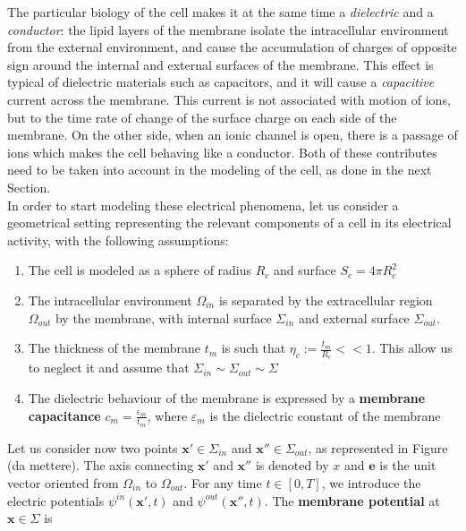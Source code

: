 \documentclass[12pt, a4paper]{report}
\begin{document}
The particular biology of the cell makes it at the same time a \textit{dielectric} and a \textit{conductor}: the lipid layers of the membrane isolate the intracellular environment from the external environment, and cause the accumulation of charges of opposite sign around the internal and external surfaces of the membrane. This effect is typical of dielectric materials such as capacitors, and it will cause a \textit{capacitive} current across the membrane. This current is not associated with motion of ions, but to the time rate of change of the surface charge on each side of the membrane. On the other side, when an ionic channel is open, there is a passage of ions which makes the cell behaving like a conductor. Both of these contributes need to be taken into account in the modeling of the cell, as done in the next Section.
\\

In order to start modeling these electrical phenomena, let us consider a geometrical setting representing the relevant components of a cell in its electrical activity, with the following assumptions:

\begin{enumerate}
	
	\item The cell is modeled as a sphere of radius $R_c$ and surface $ S_c = 4\pi R_c^2$
	
	\item The intracellular environment $\Omega_{in}$ is separated by the extracellular region $\Omega_{out}$ by the membrane, with internal surface $\Sigma_{in}$ and external surface $\Sigma_{out}$.%
	
	\item The thickness of the membrane $t_m$ is such that $ \eta_c := \frac{t_m}{R_c} << 1$. This allow us to neglect it and assume that $\Sigma_{in} \sim \Sigma_{out} \sim \Sigma$ \label{ass 3}
	
	\item The dielectric behaviour of the membrane is expressed by a \textbf{membrane capacitance}  $ c_m = \frac{\varepsilon_m}{t_m} $, where $\varepsilon_m$ is the dielectric constant of the membrane \label{ass 4}
	
\end{enumerate}

Let us consider now two points $ \textbf{x}' \in \Sigma_{in}$ and $ \textbf{x}'' \in \Sigma_{out}$, as represented in Figure (da mettere). The axis connecting $ \textbf{x}'$ and $ \textbf{x}''$ is denoted by $x$ and $\textbf{e}$ is the unit vector oriented from $\Omega_{in}$ to $\Omega_{out}$. For any time $ t \in [0,T]$, we introduce the electric potentials $ \psi^{in} (\textbf{x}',t) $ and  $ \psi^{out} (\textbf{x}'',t) $. The \textbf{membrane potential} at $ \textbf{x} \in \Sigma$ is 
\end{document}
